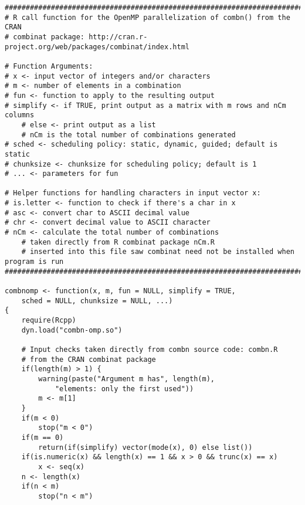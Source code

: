 {


\begin{lstlisting}
####################################################################################
# R call function for the OpenMP parallelization of combn() from the CRAN
# combinat package: http://cran.r-project.org/web/packages/combinat/index.html

# Function Arguments:
# x <- input vector of integers and/or characters
# m <- number of elements in a combination
# fun <- function to apply to the resulting output
# simplify <- if TRUE, print output as a matrix with m rows and nCm columns
	# else <- print output as a list 
	# nCm is the total number of combinations generated
# sched <- scheduling policy: static, dynamic, guided; default is static
# chunksize <- chunksize for scheduling policy; default is 1
# ... <- parameters for fun

# Helper functions for handling characters in input vector x:
# is.letter <- function to check if there's a char in x
# asc <- convert char to ASCII decimal value
# chr <- convert decimal value to ASCII character
# nCm <- calculate the total number of combinations 
	# taken directly from R combinat package nCm.R
	# inserted into this file saw combinat need not be installed when program is run
####################################################################################

combnomp <- function(x, m, fun = NULL, simplify = TRUE, 
	sched = NULL, chunksize = NULL, ...)
{
	require(Rcpp)
	dyn.load("combn-omp.so")

	# Input checks taken directly from combn source code: combn.R
	# from the CRAN combinat package
	if(length(m) > 1) {
		warning(paste("Argument m has", length(m), 
			"elements: only the first used"))
		m <- m[1]
	}
	if(m < 0)
		stop("m < 0")
	if(m == 0)
		return(if(simplify) vector(mode(x), 0) else list())
	if(is.numeric(x) && length(x) == 1 && x > 0 && trunc(x) == x)
		x <- seq(x)
	n <- length(x)
	if(n < m)
		stop("n < m")


\end{lstlisting}}
